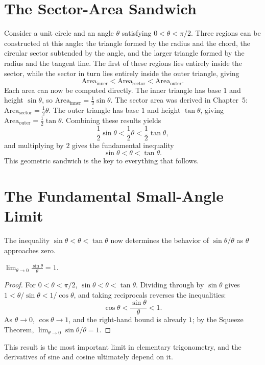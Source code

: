 \section{The Sector-Area Sandwich}

Consider a unit circle and an angle $\theta$ satisfying $0 < \theta <
\pi/2$. Three regions can be constructed at this angle: the triangle
formed by the radius and the chord, the circular sector subtended by the
angle, and the larger triangle formed by the radius and the tangent
line. The first of these regions lies entirely inside the sector, while
the sector in turn lies entirely inside the outer triangle, giving
\[
\text{Area}_{\text{inner}} < \text{Area}_{\text{sector}} <
\text{Area}_{\text{outer}}.
\]
Each area can now be computed directly. The inner triangle has base $1$
and height $\sin\theta$, so $\text{Area}_{\text{inner}} =
\tfrac12\sin\theta$. The sector area was derived in Chapter~5:
$\text{Area}_{\text{sector}} = \tfrac12\theta$. The outer triangle has
base $1$ and height $\tan\theta$, giving $\text{Area}_{\text{outer}} =
\tfrac12\tan\theta$. Combining these results yields
\[
\frac12\sin\theta < \frac12\theta < \frac12\tan\theta,
\]
and multiplying by $2$ gives the fundamental inequality
\[
\sin\theta < \theta < \tan\theta.
\]
This geometric sandwich is the key to everything that follows.

\section{The Fundamental Small-Angle Limit}

The inequality $\sin\theta < \theta < \tan\theta$ now determines the
behavior of $\sin\theta/\theta$ as $\theta$ approaches zero.

\begin{theorem}
$\displaystyle\lim_{\theta\to0} \frac{\sin\theta}{\theta} = 1$.
\end{theorem}

\begin{proof}
For $0 < \theta < \pi/2$, $\sin\theta < \theta < \tan\theta$. Dividing
through by $\sin\theta$ gives $1 < \theta/\sin\theta < 1/\cos\theta$, and
taking reciprocals reverses the inequalities:
\[
\cos\theta < \frac{\sin\theta}{\theta} < 1.
\]
As $\theta \to 0$, $\cos\theta \to 1$, and the right-hand bound is
already $1$; by the Squeeze Theorem, $\lim_{\theta\to0} \sin\theta/\theta
= 1$.
\end{proof}

This result is the most important limit in elementary trigonometry, and
the derivatives of sine and cosine ultimately depend on it.

